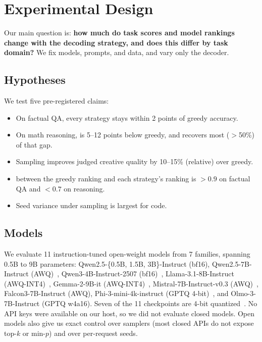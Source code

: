 \section{Experimental Design}
\label{sec:method}

Our main question is: {\bf how much do task scores and model rankings change with the decoding strategy, and does this differ by task domain?} We fix models, prompts, and data, and vary only the decoder.

\subsection{Hypotheses}
\label{sec:hyp}
We test five pre-registered claims:
\begin{itemize}[leftmargin=*,itemsep=0pt,topsep=0pt]
    \item[\bf H1] On factual QA, every strategy stays within 2 points of greedy accuracy.
    \item[\bf H2] On math reasoning, \tone is 5--12 points below greedy, and \topp recovers most ($>$50\%) of that gap.
    \item[\bf H3] Sampling improves judged creative quality by 10--15\% (relative) over greedy.
    \item[\bf H4] \ktau between the greedy ranking and each strategy's ranking is $>0.9$ on factual QA and $<0.7$ on reasoning.
    \item[\bf H5] Seed variance under sampling is largest for code.
\end{itemize}

\subsection{Models}
We evaluate 11 instruction-tuned open-weight models from 7 families, spanning 0.5B to 9B parameters: Qwen2.5-\{0.5B, 1.5B, 3B\}-Instruct (bf16), Qwen2.5-7B-Instruct (AWQ)~\citep{qwen2025qwen25}, Qwen3-4B-Instruct-2507 (bf16)~\citep{qwen2025qwen3}, Llama-3.1-8B-Instruct (AWQ-INT4)~\citep{dubey2024llama3}, Gemma-2-9B-it (AWQ-INT4)~\citep{gemma2024gemma2}, Mistral-7B-Instruct-v0.3 (AWQ)~\citep{jiang2023mistral}, Falcon3-7B-Instruct (AWQ), Phi-3-mini-4k-instruct (GPTQ 4-bit)~\citep{abdin2024phi3}, and Olmo-3-7B-Instruct (GPTQ w4a16). Seven of the 11 checkpoints are 4-bit quantized~\citep{lin2024awq,frantar2023gptq}. No API keys were available on our host, so we did not evaluate closed models. Open models also give us exact control over samplers (most closed APIs do not expose top-$k$ or min-$p$) and over per-request seeds.

